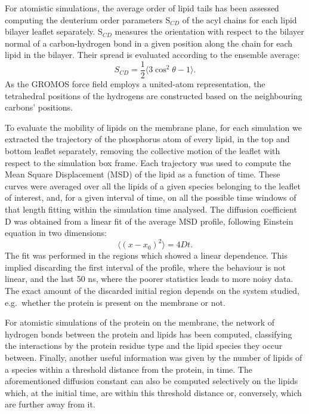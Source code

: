 For atomistic simulations, the average order of lipid tails has been assessed computing the deuterium order parameters S$_{CD}$ of the acyl chains for each lipid bilayer leaflet separately. S$_{CD}$ measures the orientation with respect to the bilayer normal of a carbon-hydrogen bond in a given position along the chain for each lipid in the bilayer. Their spread is evaluated according to the ensemble average:
\begin{equation}
S_{CD} = \frac{1}{2} \langle 3\cos^2 \theta - 1 \rangle.
\end{equation}
As the GROMOS force field employs a united-atom representation, the tetrahedral positions of the hydrogens are constructed based on the neighbouring carbons’ positions.

To evaluate the mobility of lipids on the membrane plane, for each simulation we extracted the trajectory of the phosphorus atom of every lipid, in the top and bottom leaflet separately, removing the collective motion of the leaflet with respect to the simulation box frame. Each trajectory was used to compute the Mean Square Displacement (MSD) of the lipid as a function of time. These curves were averaged over all the lipids of a given species belonging to the leaflet  of interest, and, for a given interval of time, on all the possible time windows of that length fitting within the simulation time analysed. The diffusion coefficient D was obtained from a linear fit of the average MSD profile, following Einstein equation in two dimensions:
\begin{equation}
\langle \left( x - x_0 \right)^2 \rangle = 4Dt.
\end{equation}
The fit was performed in the regions which showed a linear dependence. This implied discarding the first interval of the profile, where the behaviour is not linear, and the last 50 ns, where the poorer statistics leads to more noisy data. The exact amount of the discarded initial region depends on the system studied, e.g.\ whether the protein is present on the membrane or not.

For atomistic simulations of the protein on the membrane, the network of hydrogen bonds between the protein and lipids has been computed, classifying the interactions by the protein residue type and the lipid species they occur between.
%
Finally, another useful information was given by the number of lipids of a species within a threshold distance from the protein, in time.
%
The aforementioned diffusion constant can also be computed selectively on the lipids which, at the initial time, are within this threshold distance or, conversely, which are further away from it.

